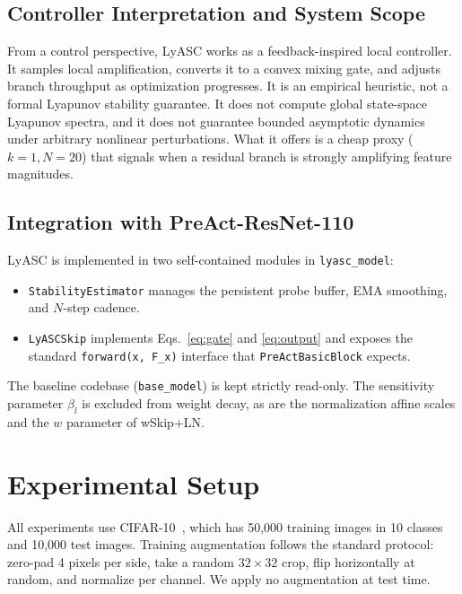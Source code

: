 \documentclass[conference,10pt]{IEEEtran}
\begin{document}
\subsection{Controller Interpretation and System Scope}

From a control perspective, LyASC works as a feedback-inspired local
controller. It samples local amplification, converts it to a convex mixing
gate, and adjusts branch throughput as optimization progresses. It is an
empirical heuristic, not a formal Lyapunov stability guarantee. It does not
compute global state-space Lyapunov spectra, and it does not guarantee
bounded asymptotic dynamics under arbitrary nonlinear perturbations. What it
offers is a cheap proxy ($k=1, N=20$) that signals when a residual branch is
strongly amplifying feature magnitudes.

\subsection{Integration with PreAct-ResNet-110}

LyASC is implemented in two self-contained modules in \texttt{lyasc\_model}:
\begin{itemize}
    \item \texttt{StabilityEstimator} manages the persistent probe buffer, EMA smoothing, and $N$-step cadence.
    \item \texttt{LyASCSkip} implements Eqs.~\ref{eq:gate} and \ref{eq:output} and exposes the standard \texttt{forward(x, F\_x)} interface that \texttt{PreActBasicBlock} expects.
\end{itemize}
The baseline codebase (\texttt{base\_model}) is kept strictly read-only.
The sensitivity parameter $\beta_l$ is excluded from weight decay, as are the
normalization affine scales and the $w$ parameter of wSkip+LN.


\section{Experimental Setup}

All experiments use CIFAR-10~\cite{krizhevsky2009learning}, which has
50,000 training images in 10 classes and 10,000 test images. Training
augmentation follows the standard protocol: zero-pad 4 pixels per side,
take a random $32 \times 32$ crop, flip horizontally at random, and
normalize per channel. We apply no augmentation at test time.
\end{document}
